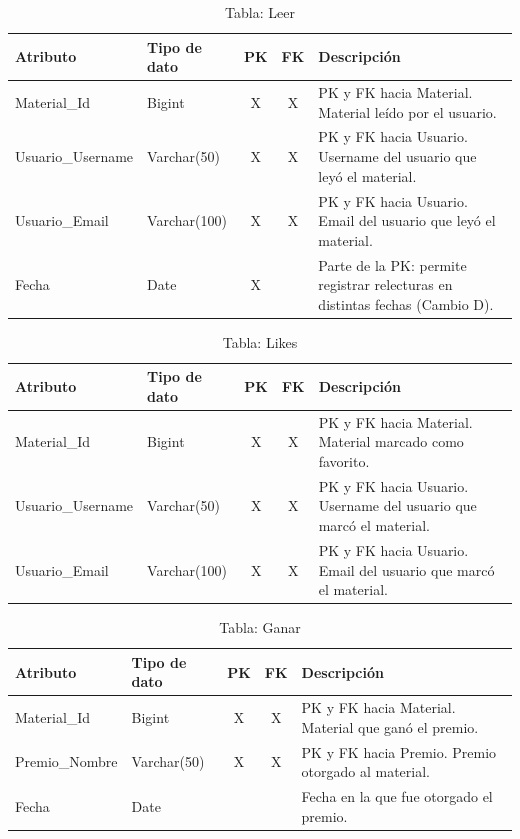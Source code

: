 \documentclass[12pt,a4paper]{article}
\begin{document}
\begin{table}[H]
\centering
\begin{tabularx}{\textwidth}{|l|l|c|c|X|}
\hline
\textbf{Atributo} & \textbf{Tipo de dato} & \textbf{PK} & \textbf{FK} & \textbf{Descripción} \\ \hline
Material\_Id      & Bigint       & X & X & PK y FK hacia Material. Material leído por el usuario. \\ \hline
Usuario\_Username & Varchar(50)  & X & X & PK y FK hacia Usuario. Username del usuario que leyó el material. \\ \hline
Usuario\_Email    & Varchar(100) & X & X & PK y FK hacia Usuario. Email del usuario que leyó el material. \\ \hline
Fecha             & Date         & X & & Parte de la PK: permite registrar relecturas en distintas fechas (Cambio D). \\ \hline
\end{tabularx}
\caption{Tabla: Leer}
\end{table}

\begin{table}[H]
\centering
\begin{tabularx}{\textwidth}{|l|l|c|c|X|}
\hline
\textbf{Atributo} & \textbf{Tipo de dato} & \textbf{PK} & \textbf{FK} & \textbf{Descripción} \\ \hline
Material\_Id      & Bigint       & X & X & PK y FK hacia Material. Material marcado como favorito. \\ \hline
Usuario\_Username & Varchar(50)  & X & X & PK y FK hacia Usuario. Username del usuario que marcó el material. \\ \hline
Usuario\_Email    & Varchar(100) & X & X & PK y FK hacia Usuario. Email del usuario que marcó el material. \\ \hline
\end{tabularx}
\caption{Tabla: Likes}
\end{table}

\begin{table}[H]
\centering
\begin{tabularx}{\textwidth}{|l|l|c|c|X|}
\hline
\textbf{Atributo} & \textbf{Tipo de dato} & \textbf{PK} & \textbf{FK} & \textbf{Descripción} \\ \hline
Material\_Id   & Bigint      & X & X & PK y FK hacia Material. Material que ganó el premio. \\ \hline
Premio\_Nombre & Varchar(50) & X & X & PK y FK hacia Premio. Premio otorgado al material. \\ \hline
Fecha          & Date        & & & Fecha en la que fue otorgado el premio. \\ \hline
\end{tabularx}
\caption{Tabla: Ganar}
\end{table}
\end{document}
